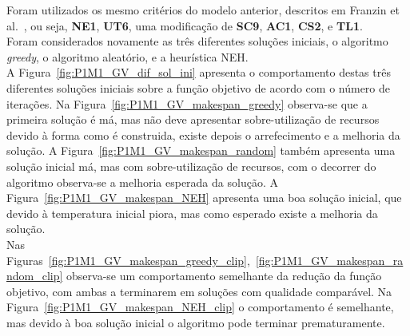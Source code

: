 Foram utilizados os mesmo critérios do modelo anterior, descritos em Franzin et al.~\cite{franzinRevisitingSimulatedAnnealing2019}, ou seja, \textbf{NE1}, \textbf{UT6}, uma modificação de \textbf{SC9}, \textbf{AC1}, \textbf{CS2}, e \textbf{TL1}.\\

Foram considerados novamente as três diferentes soluções iniciais, o algoritmo \textit{greedy}, o algoritmo aleatório, e a heurística NEH.\\
A Figura~\ref{fig:P1M1_GV_dif_sol_ini} apresenta o comportamento destas três diferentes soluções iniciais sobre a função objetivo de acordo com o número de iterações. Na Figura~\ref{fig:P1M1_GV_makespan_greedy} observa-se que a primeira solução é má, mas não deve apresentar sobre-utilização de recursos devido à forma como é construida, existe depois o arrefecimento e a melhoria da solução. A Figura~\ref{fig:P1M1_GV_makespan_random} também apresenta uma solução inicial má, mas com sobre-utilização de recursos, com o decorrer do algoritmo observa-se a melhoria esperada da solução. A Figura~\ref{fig:P1M1_GV_makespan_NEH} apresenta uma boa solução inicial, que devido à temperatura inicial piora, mas como esperado existe a melhoria da solução.\\

Nas Figuras~\ref{fig:P1M1_GV_makespan_greedy_clip},~\ref{fig:P1M1_GV_makespan_random_clip} observa-se um comportamento semelhante da redução da função objetivo, com ambas a terminarem em soluções com qualidade comparável. Na Figura~\ref{fig:P1M1_GV_makespan_NEH_clip} o comportamento é semelhante, mas devido à boa solução inicial o algoritmo pode terminar prematuramente.\\

